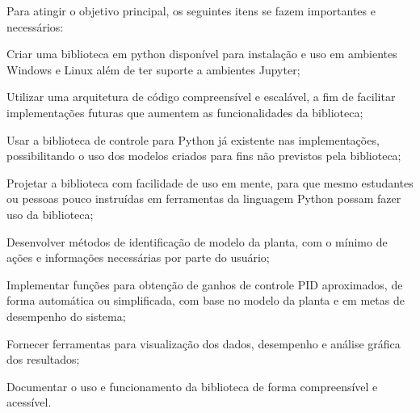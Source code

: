 Para atingir o objetivo principal, os seguintes itens se fazem importantes e necessários:
\begin{alineas}
    \item \label{itm:oe1} Criar uma biblioteca em python disponível para instalação e uso em ambientes Windows e Linux
    além de ter suporte a ambientes Jupyter;
    \item \label{itm:oe2} Utilizar uma arquitetura de código compreensível e escalável, a fim de facilitar implementações futuras
    que aumentem as funcionalidades da biblioteca;
    \item \label{itm:oe3} Usar a biblioteca de controle para Python já existente nas implementações, possibilitando o uso dos modelos
    criados para fins não previstos pela biblioteca;
    \item \label{itm:oe4} Projetar a biblioteca com facilidade de uso em mente, para que mesmo estudantes ou pessoas pouco instruídas
    em ferramentas da linguagem Python possam fazer uso da biblioteca;
    \item \label{itm:oe5} Desenvolver métodos de identificação de modelo da planta, com o mínimo de ações e informações necessárias por
    parte do usuário;
    \item \label{itm:oe6} Implementar funções para obtenção de ganhos de controle PID aproximados, de forma automática ou simplificada,
    com base no modelo da planta e em metas de desempenho do sistema;
    \item \label{itm:oe7} Fornecer ferramentas para visualização dos dados, desempenho e análise gráfica dos resultados;
    \item \label{itm:oe8} Documentar o uso e funcionamento da biblioteca de forma compreensível e acessível.
\end{alineas}
